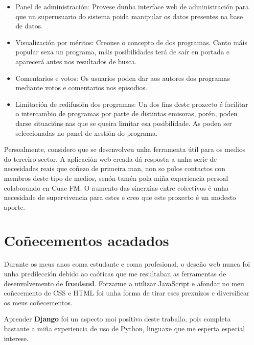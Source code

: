 \begin{itemize}
	
	\item Panel de administración: Provese dunha interface web de administración para que un superusuario do sistema poida manipular os datos presentes na base de datos.
	
	\item Visualización por méritos: Creouse o concepto de  dos programas. Canto máis popular sexa un programa, máis posibilidades terá de saír en portada e aparecerá antes nos resultados de busca.
	
	\item Comentarios e votos: Os usuarios poden dar  aos autores dos programas mediante votos e comentarios nos episodios.
	
	\item Limitación de redifusión dos programas: Un dos fins deste proxecto é facilitar o intercambio de programas por parte de distintas emisoras, porén, poden darse situacións nas que se queira limitar esa posibilidade. As  poden ser seleccionadas no panel de xestión do programa.
	
\end{itemize}


Persoalmente, considero que se desenvolveu unha ferramenta útil para os medios do terceiro sector. A aplicación web creada dá resposta a unha serie de necesidades reais que coñezo de primeira man, non so polos contactos con membros deste tipo de medios, senón tamén pola miña experiencia persoal colaborando en Cuac FM. O aumento das sinerxias entre colectivos é unha necesidade de supervivencia para estes e creo que este proxecto é un modesto aporte.   


\section{Coñecementos acadados}

Durante os meus anos coma estudante e coma profesional, o deseño web nunca foi unha predilección debido ao caóticas que me resultaban as ferramentas de desenvolvemento de \textbf{frontend}. Forzarme a utilizar JavaScript e afondar no meu coñecemento de CSS e HTML foi unha forma de tirar eses prexuízos e diversificar os meus coñecementos.

Aprender \textbf{Django} foi un aspecto moi positivo deste traballo, pois completa bastante a miña experiencia de uso de Python, linguaxe que me esperta especial interese.

